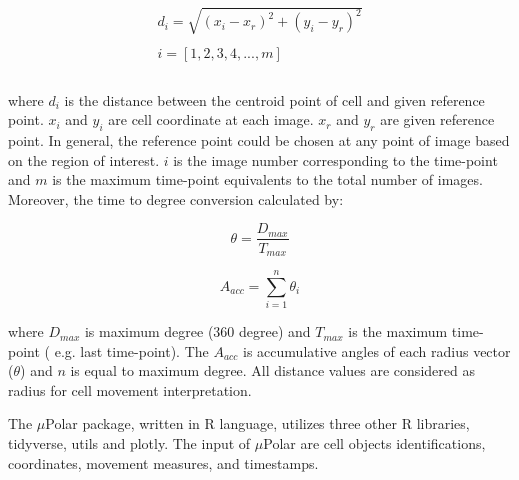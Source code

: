 \documentclass[conference]{IEEEtran}
\begin{document}
\begin{equation}
\begin{split}
d_i = \sqrt{(x_i - x_r)^2 + (y_i - y_r)^2}\\
\\
i =  [1,2,3,4,..., m ] \\
\\
\end{split}
\end{equation}

where $ d_i $ is the distance between the centroid point of cell and given reference point. $ x_i $ and $ y_i $ are cell coordinate at each image. $ x_r $ and $ y_r $ are given reference point. In general, the reference point could be chosen at any point of image based on the region of interest. $ i $ is the image number corresponding to the time-point and $ m $ is the maximum time-point equivalents to the total number of images. Moreover, the time to degree conversion calculated by: 

\begin{equation}
\theta = \frac{D_{max}} {T_{max}}
\end{equation}

\begin{equation}
A_{acc} = \sum_{i=1}^{n}{\theta_i}
\end{equation}

where $ D_{max} $ is maximum degree (360 degree) and  $ T_{max} $ is the maximum time-point ( e.g. last time-point). The  $ A_{acc} $ is accumulative angles of each radius vector ($\theta$) and $ n $ is equal to maximum degree. All distance values are considered as radius for cell movement interpretation.     








 The $\mu$Polar package, written in R language, utilizes three other R libraries,  tidyverse, utils and plotly.  The input of $\mu$Polar are cell objects identifications, coordinates, movement measures, and timestamps. 
 
\end{document}
